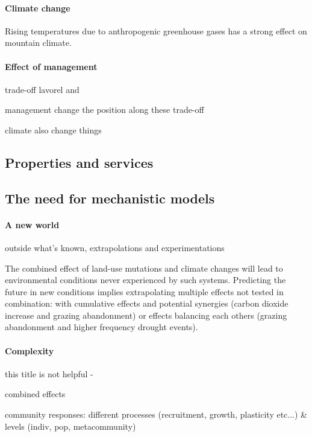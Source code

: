 \paragraph{Climate change}
Rising temperatures due to anthropogenic greenhouse gases has a strong effect on mountain climate. 


\paragraph{Effect of management}

trade-off lavorel and \parencite{schirpke_multiple_2012}

management change the position along these trade-off

climate also change things


\subsection{Properties and services}

\subsection{The need for mechanistic models}

\paragraph{A new world}
outside what's known, extrapolations and experimentations

The combined effect of land-use mutations and climate changes will lead to environmental conditions never experienced by such systems. Predicting the future in new conditions implies extrapolating multiple effects not tested in combination: with cumulative effects and potential synergies (carbon dioxide increase and grazing abandonment) or effects balancing each others (grazing abandonment and higher frequency drought events).


 \paragraph{Complexity}
 this title is not helpful -
 
 combined effects
 
 community responses: different processes (recruitment, growth, plasticity etc...) & levels (indiv, pop, metacommunity)
 

